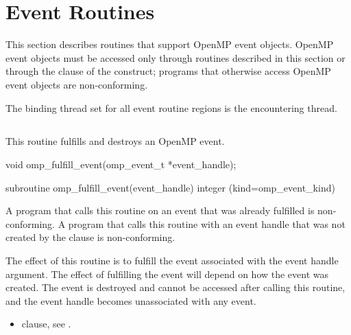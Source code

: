 \section{Event Routines}
\label{sec:Event Routines}

This section describes routines that support OpenMP event objects. OpenMP event objects must be accessed only through routines described in this section or through the  clause of the  construct; programs that otherwise access OpenMP event objects are non-conforming.

\binding

The binding thread set for all event routine regions is the encountering thread.

\subsection{}
\label{subsec:omp_fulfill_event}
\summary
This routine fulfills and destroys an OpenMP event.

\format
\begin{ccppspecific}
\begin{ompcFunction}
void omp_fulfill_event(omp_event_t *event_handle);
\end{ompcFunction}
\end{ccppspecific}

\begin{fortranspecific}
\begin{ompfFunction}
subroutine omp_fulfill_event(event_handle)
integer (kind=omp_event_kind) 
\end{ompfFunction}
\end{fortranspecific}

\constraints

A program that calls this routine on an event that was already fulfilled is non-conforming.
A program that calls this routine with an event handle that was not created by the  clause is non-conforming.

\effect

The effect of this routine is to fulfill the event associated with the event handle argument. The effect of fulfilling the event will depend on how the event was created. The event is destroyed and cannot be accessed after calling this routine, and the event handle becomes unassociated with any event.

\crossreferences

\begin{itemize}
 \item {} clause, see .
\end{itemize}
